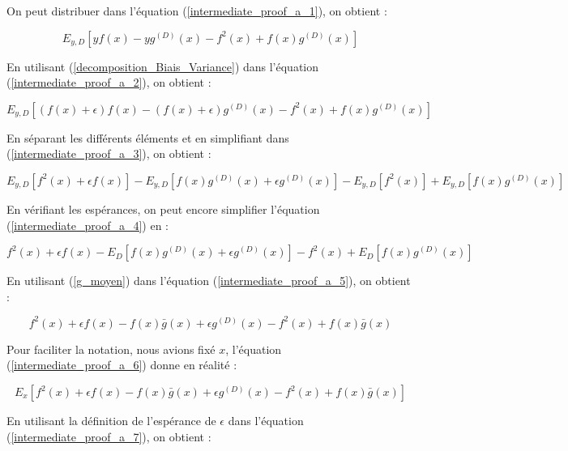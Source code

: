 \documentclass[a4paper]{article}
\begin{document}
On peut distribuer dans l'équation (\ref{intermediate_proof_a_1}), on obtient :

\begin{equation}
\label{intermediate_proof_a_2}
	E_{y,D} [yf(x) -yg^{(D)}(x) - f^2(x) + f(x)g^{(D)}(x)]
\end{equation}

En utilisant (\ref{decomposition_Biais_Variance}) dans l'équation (\ref{intermediate_proof_a_2}), on obtient :

\begin{equation}
\label{intermediate_proof_a_3}
E_{y,D} [(f(x) + \epsilon)f(x) -(f(x) + \epsilon)g^{(D)}(x) - f^2(x) + f(x)g^{(D)}(x)]
\end{equation}

En séparant les différents éléments et en simplifiant dans (\ref{intermediate_proof_a_3}), on obtient :

\begin{equation}
\label{intermediate_proof_a_4}
E_{y,D} [f^2(x) + \epsilon f(x)] - E_{y,D}[f(x)g^{(D)}(x) + \epsilon g^{(D)}(x)] - E_{y,D}[f^2(x)] + E_{y,D}[f(x)g^{(D)}(x)]
\end{equation}

En vérifiant les espérances, on peut encore simplifier l'équation (\ref{intermediate_proof_a_4}) en :

\begin{equation}
\label{intermediate_proof_a_5}
f^2(x) + \epsilon f(x) - E_D[f(x)g^{(D)}(x) + \epsilon g^{(D)}(x)] - f^2(x) + E_D[ f(x)g^{(D)}(x)]
\end{equation}

En utilisant (\ref{g_moyen}) dans l'équation (\ref{intermediate_proof_a_5}), on obtient :

\begin{equation}
\label{intermediate_proof_a_6}
f^2(x) + \epsilon f(x) - f(x)\bar{g}(x) + \epsilon g^{(D)}(x) - f^2(x) + f(x)\bar{g}(x)
\end{equation}

Pour faciliter la notation, nous avions fixé $x$, l'équation (\ref{intermediate_proof_a_6})  donne en réalité :

\begin{equation}
\label{intermediate_proof_a_7}
E_x[f^2(x) + \epsilon f(x) - f(x)\bar{g}(x) + \epsilon g^{(D)}(x) - f^2(x) + f(x)\bar{g}(x)]
\end{equation}

En utilisant la définition de l'espérance de $\epsilon$ dans l'équation (\ref{intermediate_proof_a_7}), on obtient :
\end{document}
